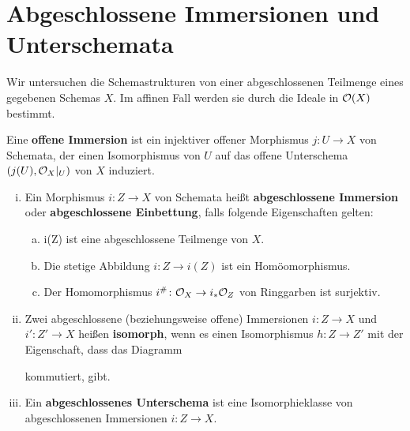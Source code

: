 
\chapter{Abgeschlossene Immersionen und Unterschemata}
Wir untersuchen die Schemastrukturen von einer abgeschlossenen Teilmenge eines gegebenen Schemas $X$. Im affinen Fall werden sie durch die Ideale in $\mathcal{O}(X)$ bestimmt.

\begin{defn}
\label{defn:7.1}
	Eine \textbf{offene Immersion} ist ein injektiver offener Morphismus $j\colon U \to X$ von Schemata, der einen Isomorphismus von $U$ auf das offene Unterschema $(j(U),\mathcal{O}_X\vert_U)$ von $X$ induziert.
\end{defn}

\begin{defn}
\label{defn:7.2}
	\begin{enumerate}[i)]
		\item Ein Morphismus $i \colon Z \to X$ von Schemata heißt \textbf{abgeschlossene Immersion} oder \textbf{abgeschlossene Einbettung}, falls folgende Eigenschaften gelten:
		\begin{enumerate}[a)]
			\item i(Z) ist eine abgeschlossene Teilmenge von $X$.
			\item Die stetige Abbildung $i\colon Z \to i(Z)$ ist ein Homöomorphismus.
			\item Der Homomorphismus $i^{\#}\colon \mathcal{O}_X \to i_*\mathcal{O}_Z$ von Ringgarben ist surjektiv.
		\end{enumerate}
		\item Zwei abgeschlossene (beziehungsweise offene) Immersionen $i\colon Z \to X$ und $i'\colon Z' \to X$ heißen \textbf{isomorph}, wenn es einen Isomorphismus $h\colon Z \to Z'$ mit der Eigenschaft, dass das Diagramm
		\begin{center}
		\end{center}
		kommutiert, gibt.
		\item Ein \textbf{abgeschlossenes Unterschema} ist eine Isomorphieklasse von abgeschlossenen Immersionen $i \colon Z \to X$.
	\end{enumerate}	
\end{defn}


